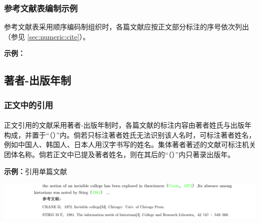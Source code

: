 \documentclass[twoside]{article}%
\begin{document}
\subsubsection{参考文献表编制示例}

参考文献表采用顺序编码制组织时，各篇文献应按正文部分标注的序号依次列出（参见 \ref{sec:numeric:cite}）。

\begin{refsection}
\textbf{示例：}

\nocite{Baker1995--,Chernik1982--,尼葛洛庞帝1996--,汪冰1997-16-16,杨宗英1996-24-29,Dowler1995-5-26}

\printbibliography[heading=none,env=indentegenv]
\end{refsection}


\subsection{著者-出版年制}
\subsubsection{正文中的引用}\label{sec:ay:citation}
\paragraph{}\label{sec:ay:citename} 正文引用的文献采用著者-出版年制时，各篇文献的标注内容由著者姓氏与出版年构成，并置于“（）”内。倘若只标注著者姓氏无法识别该人名时，可标注著者姓名，例如中国人、韩国人、日本人用汉字书写的姓名。集体著者著述的文献可标注机关团体名称。倘若正文中已提及著者姓名，则在其后的“（）”内只著录出版年。

\textbf{示例：}引用单篇文献

\noindent\hspace{-2.5cm}\includegraphics[width=\paperwidth,page=1]{tngbcitationaynew.pdf}
%
%
%
\end{document}
